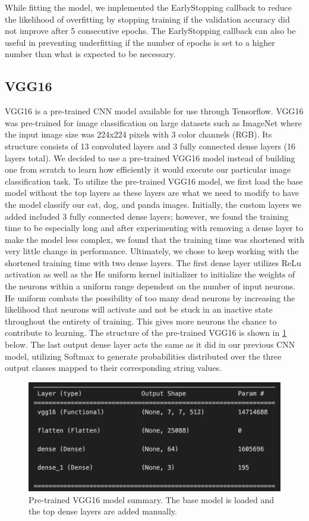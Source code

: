 While fitting the model, we implemented the EarlyStopping callback to reduce the likelihood of overfitting by stopping training if the validation accuracy did not improve after 5 consecutive epochs. The EarlyStopping callback can also be useful in preventing underfitting if the number of epochs is set to a higher number than what is expected to be necessary. 

\subsection{VGG16}
VGG16 is a pre-trained CNN model available for use through Tensorflow. VGG16 was pre-trained for image classification on large datasets such as ImageNet where the input image size was 224x224 pixels with 3 color channels (RGB). Its structure consists of 13 convoluted layers and 3 fully connected dense layers (16 layers total). We decided to use a pre-trained VGG16 model instead of building one from scratch to learn how efficiently it would execute our particular image classification task. 
To utilize the pre-trained VGG16 model, we first load the base model without the top layers as these layers are what we need to modify to have the model classify our cat, dog, and panda images. Initially, the custom layers we added included 3 fully connected dense layers; however, we found the training time to be especially long and after experimenting with removing a dense layer to make the model less complex, we found that the training time was shortened with very little change in performance. Ultimately, we chose to keep working with the shortened training time with two dense layers. The first dense layer utilizes ReLu activation as well as the He uniform kernel initializer to initialize the weights of the neurons within a uniform range dependent on the number of input neurons. He uniform combats the possibility of too many dead neurons by increasing the likelihood that neurons will activate and not be stuck in an inactive state throughout the entirety of training. This gives more neurons the chance to contribute to learning. The structure of the pre-trained VGG16 is shown in \ref{fig:figure2} below. The last output dense layer acts the same as it did in our previous CNN model, utilizing Softmax to generate probabilities distributed over the three output classes mapped to their corresponding string values. 

\begin{figure}[h]
	\centering
	\includegraphics[scale=0.5]{VGG16_structure}
	\caption{Pre-trained VGG16 model summary. The base model is loaded and the top dense layers are added manually.}
	\label{fig:figure2}
\end{figure}